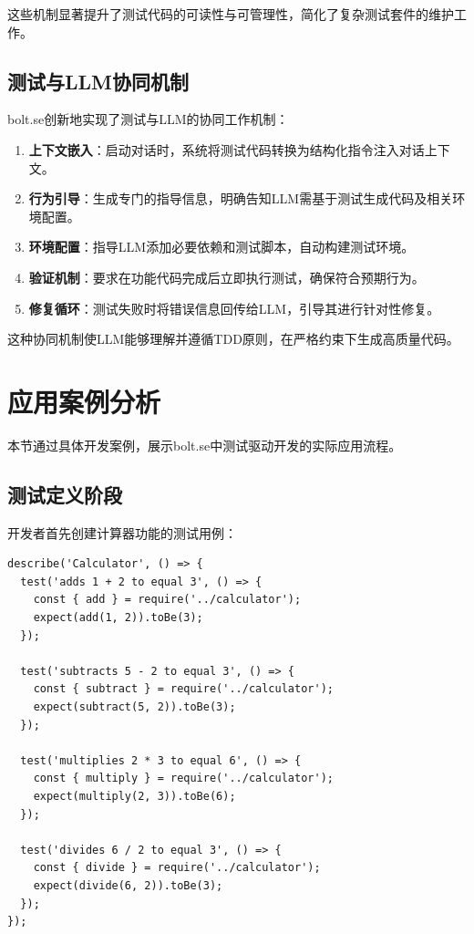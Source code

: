 这些机制显著提升了测试代码的可读性与可管理性，简化了复杂测试套件的维护工作。

\subsection{测试与LLM协同机制}

bolt.se创新地实现了测试与LLM的协同工作机制：

\begin{enumerate}
  \item \textbf{上下文嵌入}：启动对话时，系统将测试代码转换为结构化指令注入对话上下文。
  
  \item \textbf{行为引导}：生成专门的指导信息，明确告知LLM需基于测试生成代码及相关环境配置。
  
  \item \textbf{环境配置}：指导LLM添加必要依赖和测试脚本，自动构建测试环境。
  
  \item \textbf{验证机制}：要求在功能代码完成后立即执行测试，确保符合预期行为。
  
  \item \textbf{修复循环}：测试失败时将错误信息回传给LLM，引导其进行针对性修复。
\end{enumerate}

这种协同机制使LLM能够理解并遵循TDD原则，在严格约束下生成高质量代码。

\section{应用案例分析}

本节通过具体开发案例，展示bolt.se中测试驱动开发的实际应用流程。

\subsection{测试定义阶段}

开发者首先创建计算器功能的测试用例：

\begin{verbatim}
describe('Calculator', () => {
  test('adds 1 + 2 to equal 3', () => {
    const { add } = require('../calculator');
    expect(add(1, 2)).toBe(3);
  });
  
  test('subtracts 5 - 2 to equal 3', () => {
    const { subtract } = require('../calculator');
    expect(subtract(5, 2)).toBe(3);
  });
  
  test('multiplies 2 * 3 to equal 6', () => {
    const { multiply } = require('../calculator');
    expect(multiply(2, 3)).toBe(6);
  });
  
  test('divides 6 / 2 to equal 3', () => {
    const { divide } = require('../calculator');
    expect(divide(6, 2)).toBe(3);
  });
});
\end{verbatim}

